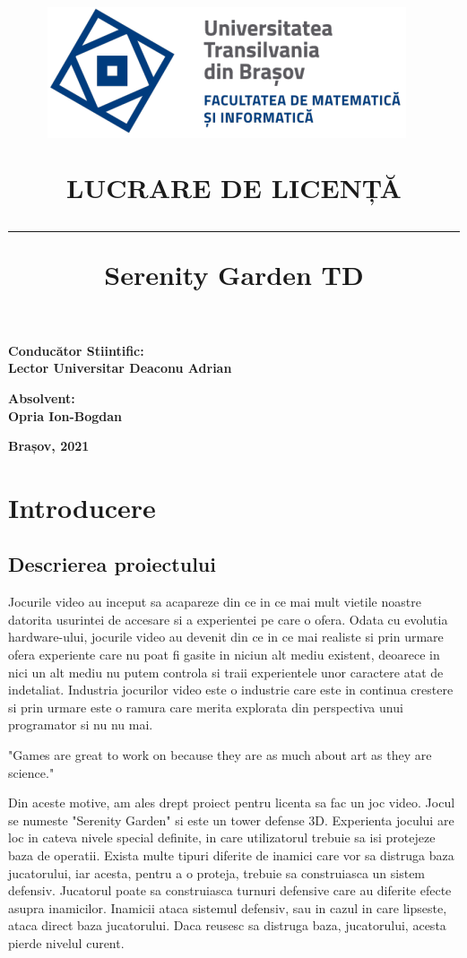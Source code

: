 \documentclass[12pt, a4paper]{article}
\title{%
	\includegraphics[height=0.3\textwidth]{UNITBV2.png}~ 
	\\[1cm]
	\vspace{20mm}
	
	\bf 	LUCRARE DE LICENȚĂ
	\noindent\rule{14cm}{1pt}
	\bf Serenity Garden TD
}
\date{}
\begin{document}
	
	
	
	\maketitle
	\vspace{10mm} %
	\begin{flushleft}
		\bf 	Conducător Stiintific:
		\bf     \\Lector Universitar Deaconu Adrian
	\end{flushleft}
	
	\begin{flushright}
		\bf Absolvent:
		\bf \\Opria Ion-Bogdan
	\end{flushright}
	
	\vspace{6mm} %
	
	\begin{center}
		\bf Brașov, 2021 
	\end{center}
	
	
	\tableofcontents
	\pagebreak
	
	\section{Introducere}
	
	\subsection{Descrierea proiectului}
	
	Jocurile video au inceput sa acapareze din ce in ce mai mult vietile noastre datorita usurintei de accesare si a experientei pe care o ofera. Odata cu evolutia hardware-ului, jocurile video au devenit din ce in ce mai realiste si prin urmare ofera experiente care nu poat fi gasite in niciun alt mediu existent, deoarece in nici un alt mediu nu putem controla si traii experientele unor caractere atat de indetaliat. Industria jocurilor video este o industrie care este in continua crestere si prin urmare este o ramura care merita explorata din perspectiva unui programator si nu nu mai. 
	
	"Games are great to work on because they are as much about art as they are science." \cite{gameProgrammingComplete}
	
	Din aceste motive, am ales drept proiect pentru licenta sa fac un joc video. Jocul se numeste "Serenity Garden" si este un tower defense 3D. Experienta jocului are loc in cateva nivele special definite, in care utilizatorul trebuie sa isi protejeze baza de operatii. Exista multe tipuri diferite de inamici care vor sa distruga baza jucatorului, iar acesta, pentru a o proteja, trebuie sa construiasca un sistem defensiv. Jucatorul poate sa construiasca turnuri defensive care au diferite efecte asupra inamicilor. Inamicii ataca sistemul defensiv, sau in cazul in care lipseste, ataca direct baza jucatorului. Daca reusesc sa distruga baza, jucatorului, acesta pierde nivelul curent.
	
\end{document}
